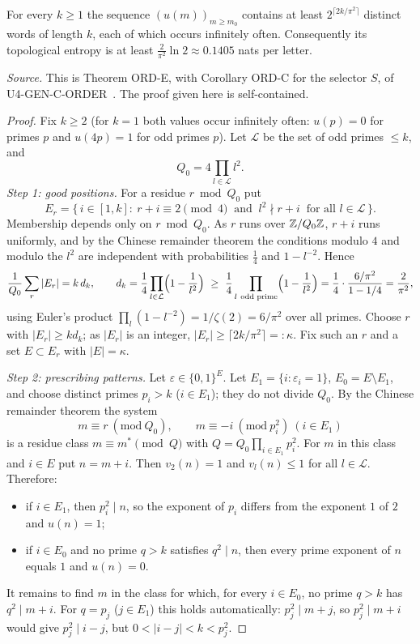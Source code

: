 \begin{theorem}\label{thm:ordE}
For every $k\ge1$ the sequence $(u(m))_{m\ge m_0}$ contains at least $2^{\lceil 2k/\pi^2\rceil}$ distinct words of length $k$, each of which occurs infinitely often. Consequently its topological entropy is at least $\frac2{\pi^2}\ln2\approx0.1405$ nats per letter.
\end{theorem}
\noindent\emph{Source.} This is Theorem ORD-E, with Corollary ORD-C for the selector $S$, of U4-GEN-C-ORDER~\cite{u4order}. The proof given here is self-contained.
\begin{proof}
Fix $k\ge2$ (for $k=1$ both values occur infinitely often: $u(p)=0$ for primes $p$ and $u(4p)=1$ for odd primes $p$). Let $\mathcal L$ be the set of odd primes $\le k$, and
\[
Q_0=4\prod_{l\in\mathcal L}l^2 .
\]
\emph{Step 1: good positions.} For a residue $r\bmod Q_0$ put
\[
E_r=\{\,i\in[1,k]:\ r+i\equiv2\!\!\pmod4\ \text{ and }\ l^2\nmid r+i\ \text{ for all }l\in\mathcal L\,\}.
\]
Membership depends only on $r\bmod Q_0$. As $r$ runs over $\mathbb{Z}/Q_0\mathbb{Z}$, $r+i$ runs uniformly, and by the Chinese remainder theorem the conditions modulo $4$ and modulo the $l^2$ are independent with probabilities $\frac14$ and $1-l^{-2}$. Hence
\[
\frac1{Q_0}\sum_{r}|E_r|=k\,d_k,\qquad d_k=\frac14\prod_{l\in\mathcal L}\Bigl(1-\frac1{l^2}\Bigr)\ \ge\ \frac14\prod_{l\ \text{odd prime}}\Bigl(1-\frac1{l^2}\Bigr)=\frac14\cdot\frac{6/\pi^2}{1-1/4}=\frac2{\pi^2},
\]
using Euler's product $\prod_{l}(1-l^{-2})=1/\zeta(2)=6/\pi^2$ over all primes. Choose $r$ with $|E_r|\ge kd_k$; as $|E_r|$ is an integer, $|E_r|\ge\lceil2k/\pi^2\rceil=:\kappa$. Fix such an $r$ and a set $E\subset E_r$ with $|E|=\kappa$.

\emph{Step 2: prescribing patterns.} Let $\varepsilon\in\{0,1\}^E$. Let $E_1=\{i:\varepsilon_i=1\}$, $E_0=E\setminus E_1$, and choose distinct primes $p_i>k$ ($i\in E_1$); they do not divide $Q_0$. By the Chinese remainder theorem the system
\[
m\equiv r\ (\mathrm{mod}\ Q_0),\qquad m\equiv-i\ (\mathrm{mod}\ p_i^2)\ (i\in E_1)
\]
is a residue class $m\equiv m^*\pmod Q$ with $Q=Q_0\prod_{i\in E_1}p_i^2$. For $m$ in this class and $i\in E$ put $n=m+i$. Then $v_2(n)=1$ and $v_l(n)\le1$ for all $l\in\mathcal L$. Therefore:
\begin{itemize}[itemsep=1pt]
\item if $i\in E_1$, then $p_i^2\mid n$, so the exponent of $p_i$ differs from the exponent $1$ of $2$ and $u(n)=1$;
\item if $i\in E_0$ and no prime $q>k$ satisfies $q^2\mid n$, then every prime exponent of $n$ equals $1$ and $u(n)=0$.
\end{itemize}
It remains to find $m$ in the class for which, for every $i\in E_0$, no prime $q>k$ has $q^2\mid m+i$. For $q=p_j$ ($j\in E_1$) this holds automatically: $p_j^2\mid m+j$, so $p_j^2\mid m+i$ would give $p_j^2\mid i-j$, but $0<|i-j|<k<p_j^2$.


\end{proof}
